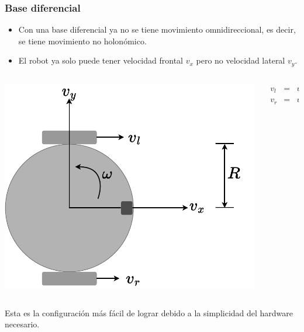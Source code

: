 \begin{frame}\frametitle{Base diferencial}
  \begin{itemize}
  \item Con una base diferencial ya no se tiene movimiento omnidireccional, es decir, se tiene movimiento no holonómico.
  \item El robot ya solo puede tener velocidad frontal $v_x$ pero no velocidad lateral $v_y$.
  \end{itemize}
  \begin{columns}
    \begin{column}{0.4\textwidth}
      \includegraphics[width=\textwidth]{Figures/DifferentialBase.pdf}
    \end{column}
    \begin{column}{0.6\textwidth}
      \begin{eqnarray*}
        v_l &=& v_x - R\omega\\
        v_r &=& v_x + R\omega
      \end{eqnarray*}
    \end{column}
  \end{columns}
  Esta es la configuración más fácil de lograr debido a la simplicidad del hardware necesario. 
\end{frame}

